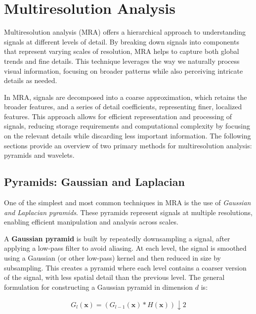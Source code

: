 \section{Multiresolution Analysis}

Multiresolution analysis (MRA) offers a hierarchical approach to understanding signals at different levels of detail. By breaking down signals into components that represent varying scales of resolution, MRA helps to capture both global trends and fine details. This technique leverages the way we naturally process visual information, focusing on broader patterns while also perceiving intricate details as needed.

In MRA, signals are decomposed into a coarse approximation, which retains the broader features, and a series of detail coefficients, representing finer, localized features. This approach allows for efficient representation and processing of signals, reducing storage requirements and computational complexity by focusing on the relevant details while discarding less important information. The following sections provide an overview of two primary methods for multiresolution analysis: pyramids and wavelets.

\subsection{Pyramids: Gaussian and Laplacian}

One of the simplest and most common techniques in MRA is the use of \textit{Gaussian and Laplacian pyramids}. These pyramids represent signals at multiple resolutions, enabling efficient manipulation and analysis across scales.

A \textbf{Gaussian pyramid} is built by repeatedly downsampling a signal, after applying a low-pass filter to avoid aliasing. At each level, the signal is smoothed using a Gaussian (or other low-pass) kernel and then reduced in size by subsampling. This creates a pyramid where each level contains a coarser version of the signal, with less spatial detail than the previous level. The general formulation for constructing a Gaussian pyramid in dimension \(d\) is:

\begin{align}
  G_l(\mathbf{x}) = (G_{l-1}(\mathbf{x}) * H(\mathbf{x})) \downarrow 2
\end{align}

